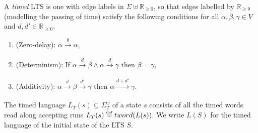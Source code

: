 \documentclass[10pt,a4paper]{amsart}
\theoremstyle{definition}
\numberwithin{equation}{section}
\newcommand{\R}{\mathbb{R}}
\newcommand{\nnreals}{{\mathbb R}_{\geq 0}}
\newcommand{\eqby}[2][=]{\stackrel{\text{{\tiny{#2}}}}{#1}}
\newcommand{\eqdef}{\eqby{def}}
\newcommand{\lang}{L_T}  %
\newcommand{\LTSlang}{L}  %
\newcommand{\tword}[1]{\mathop{tword}(#1)}
\newcommand{\tstep}[2][]{\xrightarrow[#1]{#2}}
\newcommand{\lts}{S}
\begin{document}
A \emph{timed} LTS is one with edge labels in $\Sigma\uplus\nnreals$,
so that edges labelled by $\nnreals$ (modelling the passing of time) satisfy the following conditions
for all $\alpha,\beta,\gamma\in V$ and $d,d'\in \R_{\ge 0}$.
\begin{enumerate}
    \item (Zero-delay): $\alpha\tstep{0}\alpha$,
    \item (Determinism): If
        $
        \alpha\tstep{d}\beta
        \land
        \alpha\tstep{d}\gamma$ then $\beta=\gamma$,
    \item (Additivity): $\alpha\tstep{d}\beta\tstep{d'}\gamma$ then $\alpha\tstep{d+d'}\gamma$.
\end{enumerate}
The {timed language} $\lang(s)\subseteq \Sigma_T^\omega$ of a state $s$
consists of all the timed words read along accepting runs $\lang(s)\eqdef \tword{\LTSlang(s)}$. We write $L(\lts)$ for the timed language of the initial state of the LTS $\lts$.
\end{document}
